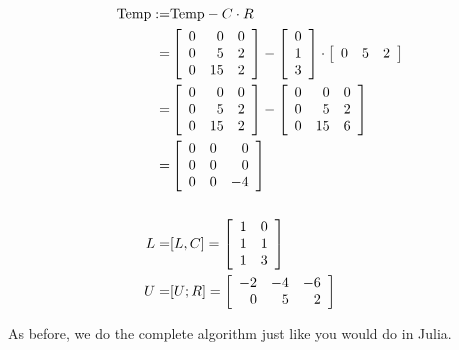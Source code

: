 \begin{align*}
    {\rm Temp} :=& {\rm Temp} - C \cdot R \\
    =& \left[ \begin{array}{rrr} 0 & 0 & 0 \\ 0 & 5 & 2 \\ 0 & 15 & 2 \end{array} \right]
    - \left[ \begin{array}{r} 0 \\ 1 \\ 3 \end{array} \right] \cdot \left[ \begin{array}{rrr} 0 & 5 & 2 \end{array} \right] \\
    =& \left[ \begin{array}{rrr} 0 & 0 & 0 \\ 0 & 5 & 2 \\ 0 & 15 & 2 \end{array} \right] - \left[ \begin{array}{rrr} 0 & 0 & 0 \\ 0 & 5 & 2 \\ 0 & 15 & 6 \end{array} \right] \\
    =& \left[ \begin{array}{rrr} 0 & 0 & 0 \\ 0 & 0 & 0 \\ 0 & 0 & -4 \end{array} \right] \\
    \\
    L =& [L, C] = \left[ \begin{array}{rr} 1 & 0 \\ 1 & 1 \\ 1 & 3 \end{array} \right] \\
    U =& [U; R] = \left[ \begin{array}{rrr} -2 & -4 & -6 \\ 0 & 5 & 2 \end{array}\right]
\end{align*}

As before, we do the complete algorithm just like you would do in Julia.\\

